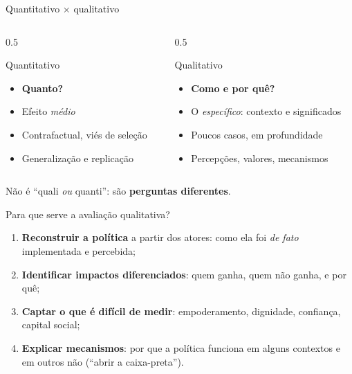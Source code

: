 \begin{frame}{Quantitativo $\times$ qualitativo}
  \begin{columns}[T]
    \begin{column}{0.5\textwidth}
      \begin{block}{Quantitativo}
        \footnotesize
        \begin{itemize}
          \item \textbf{Quanto?}
          \item Efeito \emph{médio}
          \item Contrafactual, viés de seleção
          \item Generalização e replicação
        \end{itemize}
      \end{block}
    \end{column}
    \begin{column}{0.5\textwidth}
      \begin{exerciciobox}{Qualitativo}
        \footnotesize
        \begin{itemize}
          \item \textbf{Como e por quê?}
          \item O \emph{específico}: contexto e significados
          \item Poucos casos, em profundidade
          \item Percepções, valores, mecanismos
        \end{itemize}
      \end{exerciciobox}
    \end{column}
  \end{columns}
  \vspace{0.3cm}
  \centering\small Não é ``quali \emph{ou} quanti'': são \textbf{perguntas diferentes}.
\end{frame}

\begin{frame}{Para que serve a avaliação qualitativa?}
  \begin{enumerate}
    \item \textbf{Reconstruir a política} a partir dos atores: como ela foi \emph{de fato} implementada e percebida;
    \item \textbf{Identificar impactos diferenciados}: quem ganha, quem não ganha, e por quê;
    \item \textbf{Captar o que é difícil de medir}: empoderamento, dignidade, confiança, capital social;
    \item \textbf{Explicar mecanismos}: por que a política funciona em alguns contextos e em outros não (``abrir a caixa-preta'').
  \end{enumerate}
\end{frame}

